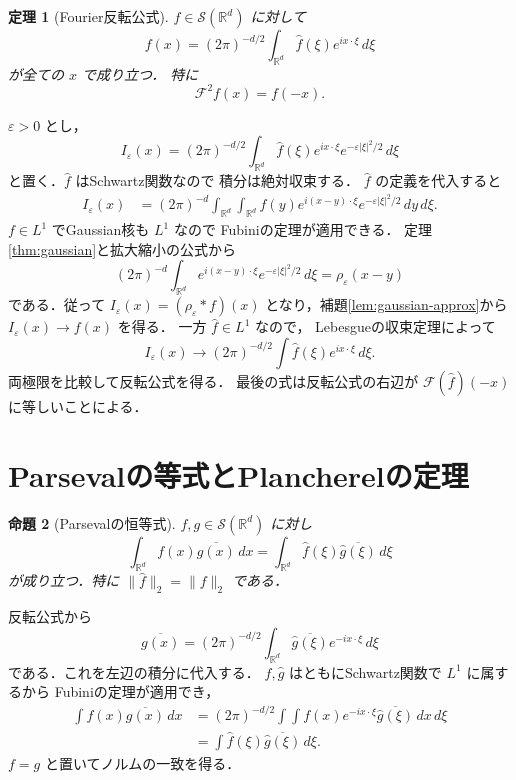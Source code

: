 \documentclass[a5paper,10pt,onecolumn]{jsarticle}
\makeatletter
\theoremstyle{mathnotetheorem}
\newtheorem{theorem}{定理}[section]
\newtheorem{proposition}[theorem]{命題}
\renewcommand{\proofname}{証明}
\renewenvironment{proof}[1][\proofname]{%
  \par\pushQED{\qed}\normalfont\topsep4\p@\@plus2\p@\relax
  \trivlist\item[\hskip\labelsep\bfseries #1]\ignorespaces
}{\popQED\endtrivlist\@endpefalse}
\newcommand{\norm}[1]{\lVert #1\rVert}
\makeatother
\begin{document}
\begin{theorem}[Fourier反転公式]\label{thm:inversion}
$f\in\mathcal S(\mathbb R^d)$ に対して
\[
 f(x)=(2\pi)^{-d/2}
 \int_{\mathbb R^d}\widehat f(\xi)e^{ix\cdot\xi}\,d\xi
\]
が全ての $x$ で成り立つ．
特に
\[
 \mathcal F^2f(x)=f(-x).
\]
\end{theorem}
\begin{proof}
$\varepsilon>0$ とし，
\[
 I_\varepsilon(x)
 =(2\pi)^{-d/2}\int_{\mathbb R^d}
 \widehat f(\xi)e^{ix\cdot\xi}
 e^{-\varepsilon|\xi|^2/2}\,d\xi
\]
と置く．$\widehat f$ はSchwartz関数なので
積分は絶対収束する．
$\widehat f$ の定義を代入すると
\begin{align*}
 I_\varepsilon(x)
 &=(2\pi)^{-d}\int_{\mathbb R^d}\int_{\mathbb R^d}
 f(y)e^{i(x-y)\cdot\xi}
 e^{-\varepsilon|\xi|^2/2}\,dy\,d\xi.
\end{align*}
$f\in L^1$ でGaussian核も $L^1$ なので
Fubiniの定理が適用できる．
定理\ref{thm:gaussian}と拡大縮小の公式から
\[
 (2\pi)^{-d}\int_{\mathbb R^d}
 e^{i(x-y)\cdot\xi}e^{-\varepsilon|\xi|^2/2}\,d\xi
 =\rho_\varepsilon(x-y)
\]
である．従って $I_\varepsilon(x)=(\rho_\varepsilon*f)(x)$
となり，補題\ref{lem:gaussian-approx}から
$I_\varepsilon(x)\to f(x)$ を得る．
一方 $\widehat f\in L^1$ なので，
Lebesgueの収束定理によって
\[
 I_\varepsilon(x)\to
 (2\pi)^{-d/2}\int\widehat f(\xi)e^{ix\cdot\xi}\,d\xi.
\]
両極限を比較して反転公式を得る．
最後の式は反転公式の右辺が
$\mathcal F(\widehat f)(-x)$ に等しいことによる．
\end{proof}

\section{Parsevalの等式とPlancherelの定理}

\begin{proposition}[Parsevalの恒等式]\label{prop:parseval}
$f,g\in\mathcal S(\mathbb R^d)$ に対し
\[
 \int_{\mathbb R^d}f(x)\overline{g(x)}\,dx
 =\int_{\mathbb R^d}
   \widehat f(\xi)\overline{\widehat g(\xi)}\,d\xi
\]
が成り立つ．特に $\norm{\widehat f}_2=\norm f_2$ である．
\end{proposition}
\begin{proof}
反転公式から
\[
 \overline{g(x)}
 =(2\pi)^{-d/2}
 \int_{\mathbb R^d}
 \overline{\widehat g(\xi)}e^{-ix\cdot\xi}\,d\xi
\]
である．これを左辺の積分に代入する．
$f,\widehat g$ はともにSchwartz関数で $L^1$ に属するから
Fubiniの定理が適用でき，
\begin{align*}
 \int f(x)\overline{g(x)}\,dx
 &=(2\pi)^{-d/2}\int\int
 f(x)e^{-ix\cdot\xi}
 \overline{\widehat g(\xi)}\,dx\,d\xi\\
 &=\int\widehat f(\xi)\overline{\widehat g(\xi)}\,d\xi.
\end{align*}
$f=g$ と置いてノルムの一致を得る．
\end{proof}
\end{document}
